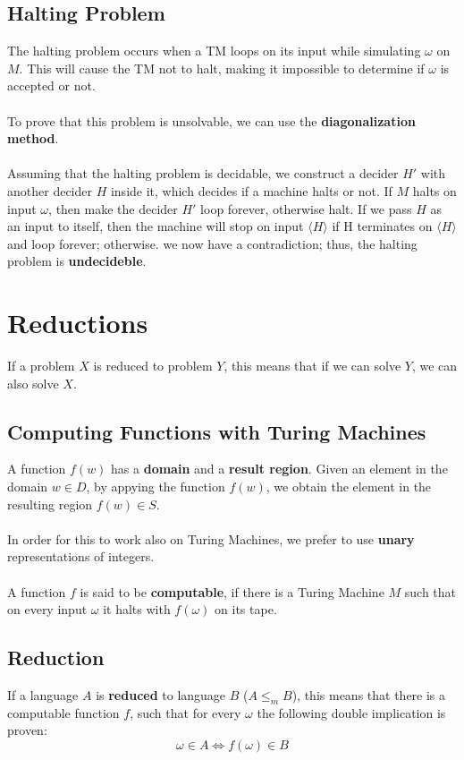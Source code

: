 \documentclass{article}
\begin{document}
\subsection{Halting Problem}
The halting problem occurs when a TM loops on its input while simulating $\omega$ on $M$. This will cause the TM not to halt, making it impossible to determine if $\omega$ is accepted or not. \\ \\
To prove that this problem is unsolvable, we can use the \textbf{diagonalization method}. \\ \\
Assuming that the halting problem is decidable, we construct a decider $H'$ with another decider $H$ inside it, which decides if a machine halts or not. If $M$ halts on input $\omega$, then make the decider $H'$ loop forever, otherwise halt. If we pass $H$ as an input to itself, then the machine will stop on input $\langle H \rangle$ if H terminates on $\langle H \rangle$ and loop forever; otherwise. we now have a contradiction; thus, the halting problem is \textbf{undecideble}.

\section{Reductions}
If a problem $X$ is reduced to problem $Y$, this means that if we can solve $Y$, we can also solve $X$.

\subsection{Computing Functions with Turing Machines}
A function $f(w)$ has a \textbf{domain} and a \textbf{result region}. Given an element in the domain $w \in D$, by appying the function $f(w)$, we obtain the element in the resulting region $f(w) \in S$. \\ \\
In order for this to work also on Turing Machines, we prefer to use \textbf{unary} representations of integers. \\ \\
A function $f$ is said to be \textbf{computable}, if there is a Turing Machine $M$ such that on every input $\omega$ it halts with $f(\omega)$ on its tape.

\subsection{Reduction}
If a language $A$ is \textbf{reduced} to language $B$ ($A \leq_m B$), this means that there is a computable function $f$, such that for every $\omega$ the following double implication is proven:
\[ \omega \in A \iff f(\omega) \in B \]
\end{document}
